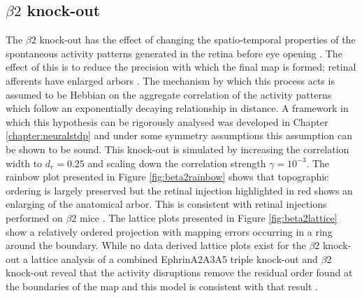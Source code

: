 \subsection{$\beta2$ knock-out}
The $\beta2$ knock-out has the effect of changing the spatio-temporal properties of the spontaneous activity patterns generated in the retina before eye opening \cite{Burbridge2014-ib, Xu2011-mt, Dhande2011-gj, Stafford2009}. The effect of this is to reduce the precision with which the final map is formed; retinal afferents have enlarged arbors \cite{McLaughlin2003-co, Burbridge2014-ib, Xu2011-mt}. The mechanism by which this process acts is assumed to be Hebbian on the aggregate correlation of the activity patterns which follow an exponentially decaying relationship in distance. A framework in which this hypothesis can be rigorously analysed was developed in Chapter \ref{chapter:neuralstdp} and under some symmetry assumptions this assumption can be shown to be sound. This knock-out is simulated by increasing the correlation width to $d_r=0.25$ and scaling down the correlation strength $\gamma = 10^{-3}$. The rainbow plot presented in Figure \ref{fig:beta2rainbow} shows that topographic ordering is largely preserved but the retinal injection highlighted in red shows an enlarging of the anatomical arbor. This is consistent with retinal injections performed on $\beta2$ mice \cite{Burbridge2014-ib, McLaughlin2003-yy}. The lattice plots presented in Figure \ref{fig:beta2lattice} show a relatively ordered projection with mapping errors occurring in a ring around the boundary. While no data derived lattice plots exist for the $\beta2$ knock-out a lattice analysis of a combined EphrinA2A3A5 triple knock-out and $\beta2$ knock-out reveal that the activity disruptions remove the residual order found at the boundaries of the map and this model is consistent with that result \cite{Willshaw2014-ms}.
